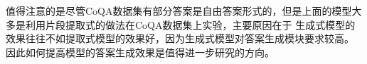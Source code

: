 \documentclass{article}
\newcommand{\upcite}[1]{\textsuperscript{\textsuperscript{\cite{#1}}}}
\begin{document}





值得注意的是尽管CoQA数据集有部分答案是自由答案形式的，但是上面的模型大多是利用片段提取式的做法在CoQA数据集上实验，主要原因在于
生成式模型的效果往往不如提取式模型的效果好，因为生成式模型对答案生成模块要求较高。
因此如何提高模型的答案生成效果是值得进一步研究的方向。

%



%
%
%

%
%
%
\end{document}
